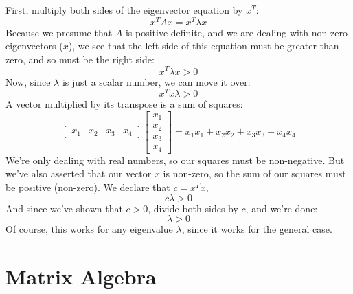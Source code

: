 \documentclass[11pt]{report}
\begin{document}
First, multiply both sides of the eigenvector equation by $x^T$:
\[ x^TAx = x^T\lambda x \]
Because we presume that $A$ is positive definite, and we are dealing with non-zero eigenvectors ($x$), we see that the left side of this equation must be greater than zero, and so must be the right side:
\[ x^T\lambda x > 0 \]
Now, since $\lambda$ is just a scalar number, we can move it over:
\[ x^Tx\lambda > 0 \]
A vector multiplied by its transpose is a sum of squares:
\[
  \begin{bmatrix}
    x_1 & x_2 & x_3 & x_4
  \end{bmatrix}
  \begin{bmatrix}
    x_1 \\ x_2 \\ x_3 \\ x_4
  \end{bmatrix}
  =
  x_1x_1 + x_2x_2 + x_3x_3 + x_4x_4
\]
We're only dealing with real numbers, so our squares must be non-negative. But we've also asserted that our vector $x$ is non-zero, so the sum of our squares must be positive (non-zero). We declare that $c = x^Tx$,
\[ c\lambda > 0 \]
And since we've shown that $c > 0$, divide both sides by $c$, and we're done:
\[ \lambda > 0 \]
Of course, this works for any eigenvalue $\lambda$, since it works for the general case.


\section{Matrix Algebra}
\end{document}
